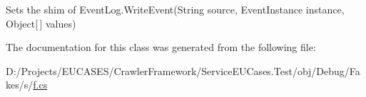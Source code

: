 Sets the shim of Event\-Log.\-Write\-Event(\-String source, Event\-Instance instance, Object\mbox{[}$\,$\mbox{]} values)



The documentation for this class was generated from the following file\-:\begin{DoxyCompactItemize}
\item 
D\-:/\-Projects/\-E\-U\-C\-A\-S\-E\-S/\-Crawler\-Framework/\-Service\-E\-U\-Cases.\-Test/obj/\-Debug/\-Fakes/s/\hyperlink{s_2f_8cs}{f.\-cs}\end{DoxyCompactItemize}
